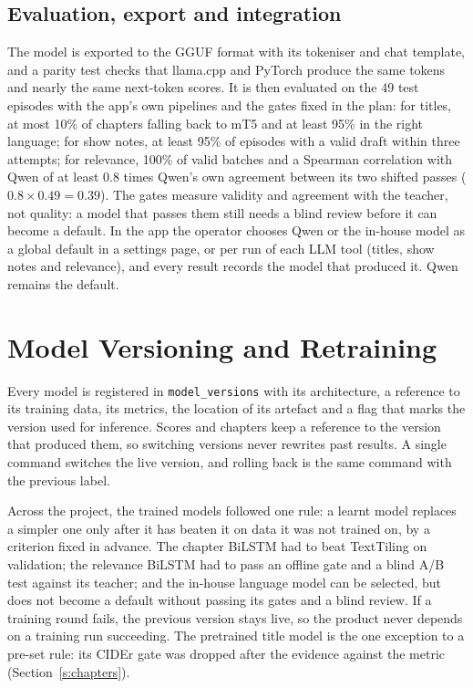 \subsection*{Evaluation, export and integration}

The model is exported to the GGUF format with its tokeniser and chat template, and a parity test checks that llama.cpp and PyTorch produce the same tokens and nearly the same next-token scores. It is then evaluated on the 49 test episodes with the app's own pipelines and the gates fixed in the plan: for titles, at most 10\% of chapters falling back to mT5 and at least 95\% in the right language; for show notes, at least 95\% of episodes with a valid draft within three attempts; for relevance, 100\% of valid batches and a Spearman correlation with Qwen of at least 0.8 times Qwen's own agreement between its two shifted passes ($0.8 \times 0.49 = 0.39$). The gates measure validity and agreement with the teacher, not quality: a model that passes them still needs a blind review before it can become a default. In the app the operator chooses Qwen or the in-house model as a global default in a settings page, or per run of each LLM tool (titles, show notes and relevance), and every result records the model that produced it. Qwen remains the default.

\section{Model Versioning and Retraining}

Every model is registered in \texttt{model\_versions} with its architecture, a reference to its training data, its metrics, the location of its artefact and a flag that marks the version used for inference. Scores and chapters keep a reference to the version that produced them, so switching versions never rewrites past results. A single command switches the live version, and rolling back is the same command with the previous label.

Across the project, the trained models followed one rule: a learnt model replaces a simpler one only after it has beaten it on data it was not trained on, by a criterion fixed in advance. The chapter BiLSTM had to beat TextTiling on validation; the relevance BiLSTM had to pass an offline gate and a blind A/B test against its teacher; and the in-house language model can be selected, but does not become a default without passing its gates and a blind review. If a training round fails, the previous version stays live, so the product never depends on a training run succeeding. The pretrained title model is the one exception to a pre-set rule: its CIDEr gate was dropped after the evidence against the metric (Section~\ref{s:chapters}).

